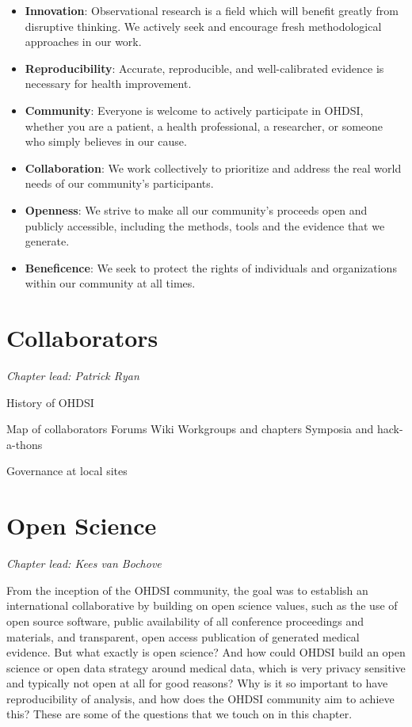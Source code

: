 \documentclass[11pt]{book}
\theoremstyle{definition}
\theoremstyle{definition}
\theoremstyle{definition}
\theoremstyle{remark}
\begin{document}
\begin{itemize}
\item
  \textbf{Innovation}: Observational research is a field which will benefit greatly from disruptive thinking. We actively seek and encourage fresh methodological approaches in our work.
\item
  \textbf{Reproducibility}: Accurate, reproducible, and well-calibrated evidence is necessary for health improvement.
\item
  \textbf{Community}: Everyone is welcome to actively participate in OHDSI, whether you are a patient, a health professional, a researcher, or someone who simply believes in our cause.
\item
  \textbf{Collaboration}: We work collectively to prioritize and address the real world needs of our community's participants.
\item
  \textbf{Openness}: We strive to make all our community's proceeds open and publicly accessible, including the methods, tools and the evidence that we generate.
\item
  \textbf{Beneficence}: We seek to protect the rights of individuals and organizations within our community at all times.
\end{itemize}

\hypertarget{Collaborators}{%
\chapter{Collaborators}\label{Collaborators}}

\emph{Chapter lead: Patrick Ryan}

History of OHDSI

Map of collaborators
Forums
Wiki
Workgroups and chapters
Symposia and hack-a-thons

Governance at local sites

\hypertarget{OpenScience}{%
\chapter{Open Science}\label{OpenScience}}

\emph{Chapter lead: Kees van Bochove}

From the inception of the OHDSI community, the goal was to establish an international collaborative by building on open science values, such as the use of open source software, public availability of all conference proceedings and materials, and transparent, open access publication of generated medical evidence. But what exactly is open science? And how could OHDSI build an open science or open data strategy around medical data, which is very privacy sensitive and typically not open at all for good reasons? Why is it so important to have reproducibility of analysis, and how does the OHDSI community aim to achieve this? These are some of the questions that we touch on in this chapter.
\end{document}
